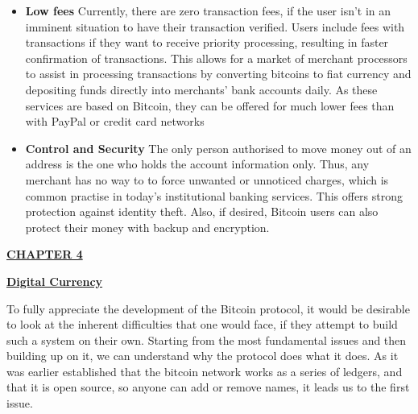 \documentclass[12pt,a4paper]{report}
\begin{document}
\begin{flushleft}
\begin{itemize}
  \vspace{10mm}
 
  
  \item \textbf{Low fees} \newline 
  Currently, there are zero transaction fees, if the user isn't in an imminent situation to have their transaction verified. Users include fees with transactions if they want to receive priority processing, resulting in faster confirmation of transactions. This allows for a market of merchant processors to assist in processing transactions by converting bitcoins to fiat currency and depositing funds directly into merchants' bank accounts daily. As these services are based on Bitcoin, they can be offered for much lower fees than with PayPal or credit card networks
  
  \vspace{10mm}
  
  \item \textbf{Control and Security} \newline 
  The only person authorised to move money out of an address is the one who holds the account information only. Thus, any merchant has no way to to force unwanted or unnoticed charges, which is common practise in today's institutional banking services. This offers strong protection against identity theft. Also, if desired, Bitcoin users can also protect their money with backup and encryption.
  

\end{itemize}


\newpage

\begin{center}\underline{  \Large\textbf{CHAPTER 4}}\end{center}
\begin{center}\underline{ \Large \textbf{Digital Currency}}\end{center}

\vspace{10mm}

To fully appreciate the development of the Bitcoin protocol, it would be desirable to look at the inherent difficulties that one would face, if they attempt to build such a system on their own. Starting from the most fundamental issues and then building up on it, we can understand why the protocol does what it does.
As it was earlier established that the bitcoin network works as a series of ledgers, and that it is open source, so anyone can add or remove names, it leads us to the first issue.
\vspace{10mm}


\end{flushleft}
\end{document}
